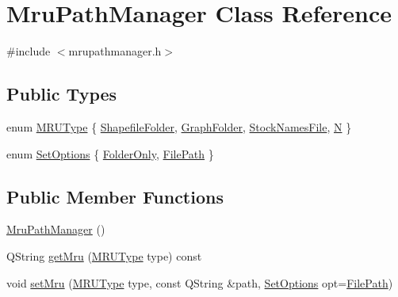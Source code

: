 \hypertarget{class_mru_path_manager}{}\section{Mru\+Path\+Manager Class Reference}
\label{class_mru_path_manager}


{\ttfamily \#include $<$mrupathmanager.\+h$>$}

\subsection*{Public Types}
\begin{DoxyCompactItemize}
\item 
enum \mbox{\hyperlink{class_mru_path_manager_af76b40b430d36bd39ed8c41ef72f66c4}{M\+R\+U\+Type}} \{ \mbox{\hyperlink{class_mru_path_manager_af76b40b430d36bd39ed8c41ef72f66c4a07a42da68d48073f6a37a3a3d152bbdf}{Shapefile\+Folder}}, 
\mbox{\hyperlink{class_mru_path_manager_af76b40b430d36bd39ed8c41ef72f66c4afee528184bdc91c1f43c5e73b7494399}{Graph\+Folder}}, 
\mbox{\hyperlink{class_mru_path_manager_af76b40b430d36bd39ed8c41ef72f66c4a4ca5422d104d910a618c85e1852ca901}{Stock\+Names\+File}}, 
\mbox{\hyperlink{class_mru_path_manager_af76b40b430d36bd39ed8c41ef72f66c4ab03dc2c39c706869a1c738558ada6149}{N}}
 \}
\item 
enum \mbox{\hyperlink{class_mru_path_manager_a7d98725d2fb645b3d19fdf55ef2286b5}{Set\+Options}} \{ \mbox{\hyperlink{class_mru_path_manager_a7d98725d2fb645b3d19fdf55ef2286b5adf93bb25be6c3b27a6bcf781ed9d7d44}{Folder\+Only}}, 
\mbox{\hyperlink{class_mru_path_manager_a7d98725d2fb645b3d19fdf55ef2286b5ac9bb23f8cf71965e0d242ab5e2f42dfc}{File\+Path}}
 \}
\end{DoxyCompactItemize}
\subsection*{Public Member Functions}
\begin{DoxyCompactItemize}
\item 
\mbox{\hyperlink{class_mru_path_manager_afd3f56f5208d61222ac8d838bb94d764}{Mru\+Path\+Manager}} ()
\item 
Q\+String \mbox{\hyperlink{class_mru_path_manager_a827245405517eac2b8cd359f8b2c3c69}{get\+Mru}} (\mbox{\hyperlink{class_mru_path_manager_af76b40b430d36bd39ed8c41ef72f66c4}{M\+R\+U\+Type}} type) const
\item 
void \mbox{\hyperlink{class_mru_path_manager_a4736d4bf946a95923f9261a37f87010f}{set\+Mru}} (\mbox{\hyperlink{class_mru_path_manager_af76b40b430d36bd39ed8c41ef72f66c4}{M\+R\+U\+Type}} type, const Q\+String \&path, \mbox{\hyperlink{class_mru_path_manager_a7d98725d2fb645b3d19fdf55ef2286b5}{Set\+Options}} opt=\mbox{\hyperlink{class_mru_path_manager_a7d98725d2fb645b3d19fdf55ef2286b5ac9bb23f8cf71965e0d242ab5e2f42dfc}{File\+Path}})
\end{DoxyCompactItemize}


